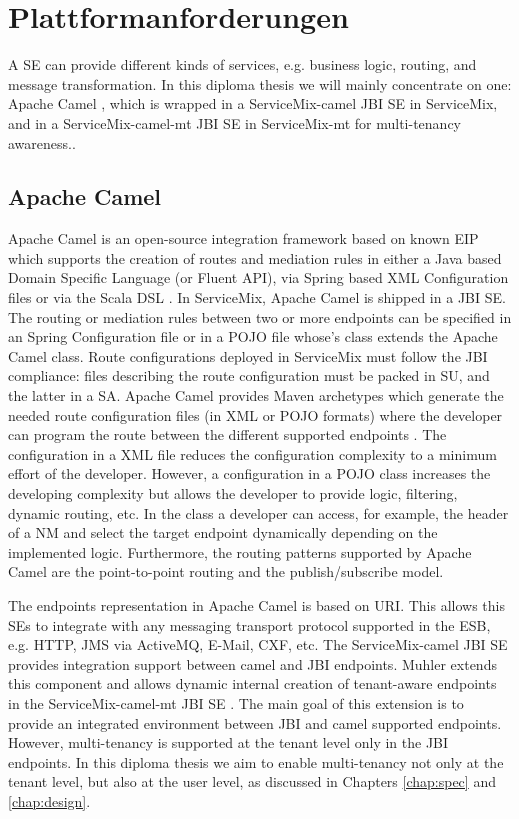 \section{Plattformanforderungen}
\label{sec:Plattformanforderungen}  

A \ac{SE} can provide different kinds of services, e.g. business logic, routing, and message transformation. In this diploma thesis we will mainly concentrate on one: Apache Camel \cite{Camel2011}, which is wrapped in a ServiceMix-camel \ac{JBI} \ac{SE} in ServiceMix, and in a ServiceMix-camel-mt \ac{JBI} \ac{SE} in ServiceMix-mt  for multi-tenancy awareness..

\subsection{Apache Camel}

Apache Camel is an open-source integration framework based on known \ac{EIP} which supports the creation of routes and mediation rules in either a Java based Domain Specific Language (or Fluent API), via Spring based XML Configuration files or via the Scala DSL \cite{Camel2011}. In ServiceMix, Apache Camel is shipped in a \ac{JBI} \ac{SE}. The routing or mediation rules between two or more endpoints can be specified in an Spring Configuration file or in a \ac{POJO} file whose's class extends the Apache Camel  class. Route configurations deployed in ServiceMix must follow the \ac{JBI} compliance: files describing the route configuration must be packed in \ac{SU}, and the latter in a \ac{SA}. Apache Camel provides Maven archetypes which generate the needed route configuration files (in \ac{XML} or \ac{POJO} formats) where the developer can program the route between the different supported endpoints \cite{MAVEN}. The configuration in a \ac{XML} file reduces the configuration complexity to a minimum effort of the developer. However, a configuration in a \ac{POJO} class increases the developing complexity but allows the developer to provide logic, filtering, dynamic routing, etc. In the  class a developer can access, for example, the header of a \ac{NM} and select the target endpoint dynamically depending on the implemented logic. Furthermore, the routing patterns supported by Apache Camel are the point-to-point routing and the publish/subscribe model. 

The endpoints representation in Apache Camel is based on \ac{URI}. This allows this \ac{SE}s to integrate with any messaging transport protocol supported in the \ac{ESB}, e.g. \ac{HTTP}, \ac{JMS} via ActiveMQ, E-Mail, CXF, etc. The ServiceMix-camel \ac{JBI} \ac{SE} provides integration support between camel and \ac{JBI} endpoints. Muhler extends this component and allows dynamic internal creation of tenant-aware endpoints in the ServiceMix-camel-mt \ac{JBI} \ac{SE} \cite{Muhler2012}. The main goal of this extension is to provide an integrated environment between \ac{JBI} and camel supported endpoints. However, multi-tenancy is supported at the tenant level only in the \ac{JBI} endpoints. In this diploma thesis we aim to enable multi-tenancy not only at the tenant level, but also at the user level, as discussed in Chapters \ref{chap:spec} and \ref{chap:design}.

